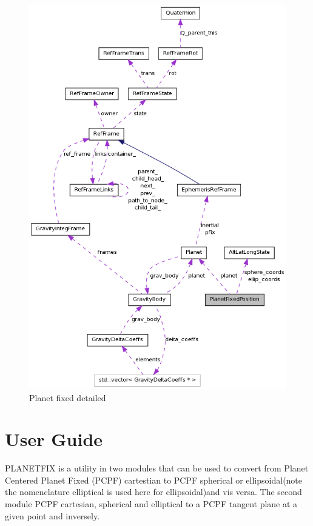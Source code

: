 \documentclass[twoside,11pt,titlepage]{report}
\begin{document}
\begin{figure}[htp]
\centering
\includegraphics [width=5in]{figs/pfixcoll.png}
\caption{Planet fixed detailed }
\label{fig:5}
\end{figure}



\chapter{User Guide}\label{ch:user}

PLANETFIX is a utility in two modules that can be used to convert from Planet Centered Planet Fixed (PCPF) cartestian to PCPF spherical or ellipsoidal(note the nomenclature elliptical is used here for ellipsoidal)and vis versa. The second module PCPF cartesian, spherical and elliptical to a PCPF tangent plane at a given point and inversely.
\end{document}
